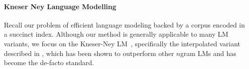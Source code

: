 
\paragraph{Kneser Ney Language Modelling}
\label{sec-lm}


Recall our problem of efficient \ngram language modeling backed by a
corpus encoded in a succinct index. %
Although our method is generally applicable to many LM variants, we focus on the Kneser-Ney LM~\cite{kneser1995improved}, specifically the interpolated variant described in , which has been shown to outperform other $n$gram LMs and has become the de-facto standard.

